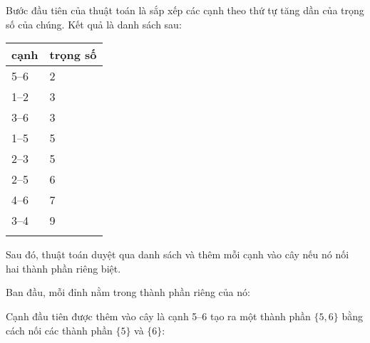 \begin{samepage}
Bước đầu tiên của thuật toán là sắp xếp các
cạnh theo thứ tự tăng dần của trọng số của chúng.
Kết quả là danh sách sau:

\begin{tabular}{ll}
\\
cạnh & trọng số \\
\hline
5--6 & 2 \\
1--2 & 3 \\
3--6 & 3 \\
1--5 & 5 \\
2--3 & 5 \\
2--5 & 6 \\
4--6 & 7 \\
3--4 & 9 \\
\\
\end{tabular}
\end{samepage}

Sau đó, thuật toán duyệt qua danh sách
và thêm mỗi cạnh vào cây nếu nó nối
hai thành phần riêng biệt.

Ban đầu, mỗi đỉnh nằm trong thành phần riêng của nó:

\begin{center}
\end{center}
Cạnh đầu tiên được thêm vào cây là
cạnh 5--6 tạo ra một thành phần $\{5,6\}$
bằng cách nối các thành phần $\{5\}$ và $\{6\}$:

